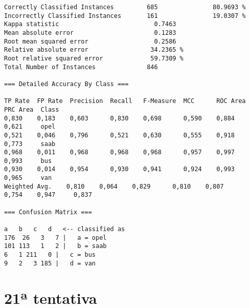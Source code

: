 \documentclass[
	article,			%
	11pt,				%
	oneside,			%
	a4paper,			%
	english,			%
	brazil,				%
	sumario=tradicional
	]{abntex2}
\begin{document}
\begin{lstlisting}
Correctly Classified Instances         685               80.9693 %
Incorrectly Classified Instances       161               19.0307 %
Kappa statistic                          0.7463
Mean absolute error                      0.1283
Root mean squared error                  0.2586
Relative absolute error                 34.2365 %
Root relative squared error             59.7309 %
Total Number of Instances              846     

=== Detailed Accuracy By Class ===

TP Rate  FP Rate  Precision  Recall   F-Measure  MCC      ROC Area  PRC Area  Class
0,830    0,183    0,603      0,830    0,698      0,590    0,884     0,621     opel
0,521    0,046    0,796      0,521    0,630      0,555    0,918     0,773     saab
0,968    0,011    0,968      0,968    0,968      0,957    0,997     0,993     bus
0,930    0,014    0,954      0,930    0,941      0,924    0,993     0,965     van
Weighted Avg.    0,810    0,064    0,829      0,810    0,807      0,754    0,947     0,837     

=== Confusion Matrix ===

a   b   c   d   <-- classified as
176  26   3   7 |   a = opel
101 113   1   2 |   b = saab
6   1 211   0 |   c = bus
9   2   3 185 |   d = van

\end{lstlisting}

\section{21ª tentativa}
\end{document}
